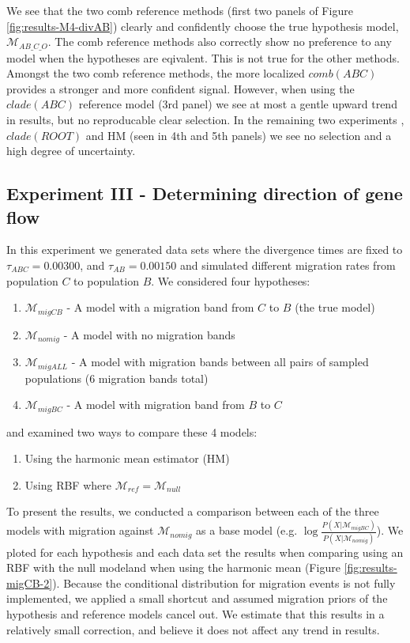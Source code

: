\documentclass[11pt]{article}
\newcommand{\M}{\mathcal{M}}
\newcommand{\Mref}{\M_{ref}}
\newcommand{\1}{\mathbbm{1}}
\begin{document}
We see that the two comb reference methods (first two panels of Figure \ref{fig:results-M4-divAB}) clearly and confidently choose the true hypothesis model, $\M_{AB\_C\_O}$.
%
The comb reference methods also correctly show no preference to any model when the hypotheses are eqivalent. This is not true for the other methods.
%
Amongst the two comb reference methods, the more localized $comb(ABC)$ provides a stronger and more confident signal.
%
However, when using the $clade(ABC)$ reference model (3rd panel) we see at most a gentle upward trend in results, but no reproducable clear selection. 
%
In the remaining two experiments ,$clade(ROOT)$ and HM (seen in 4th and 5th panels) we see no selection and a high degree of uncertainty.



\subsection{Experiment III - Determining direction of gene flow}
In this experiment we generated data sets where the divergence times are fixed to $\tau_{ABC} = 0.00300$, and $\tau_{AB} = 0.00150$ and simulated different migration rates from population $C$ to population $B$.
%
We considered four hypotheses:
\begin{enumerate}

\item $\M_{migCB}$ - A model with a migration band from $C$ to $B$ (the true model)

\item $\M_{nomig}$ - A model with no migration bands

\item $\M_{migALL}$ - A model with migration bands between all pairs of sampled populations (6 migration bands total)

\item $\M_{migBC}$ - A model with migration band from $B$ to $C$

\end{enumerate}
%
and examined two ways to compare these 4 models:
\begin{enumerate}
\item Using the harmonic mean estimator (HM)
\item Using RBF where $\Mref = \M_{null}$

\end{enumerate}

To present the results, we conducted a comparison between each of the three models with migration against $\M_{nomig}$ as a base model (e.g. $\log{ \frac{P(X|\M_{migBC})}{P(X|\M_{nomig})}}$). 
%
We ploted for each hypothesis and each data set the results when comparing using an RBF with the null modeland when using the harmonic mean (Figure \ref{fig:results-migCB-2}). 
%
Because the conditional distribution for migration events is not fully implemented, we applied a small shortcut and assumed migration priors of the hypothesis and reference models cancel out. We estimate that this results in a relatively small correction, and believe it does not affect any trend in results.
\end{document}
